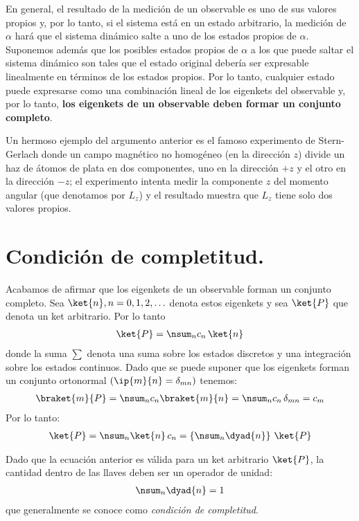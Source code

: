 En general, el resultado de la medición de un observable es uno de sus valores propios y, por lo tanto, si el sistema está en un estado arbitrario, la medición de $\alpha$ hará que el sistema dinámico salte a uno de los estados propios de $\alpha$. Suponemos además que los posibles estados propios de $\alpha$ a los que puede saltar el sistema dinámico son tales que el estado original debería ser expresable linealmente en términos de los estados propios. Por lo tanto, cualquier estado puede expresarse como una combinación lineal de los eigenkets del observable y, por lo tanto, \textbf{los eigenkets de un observable deben formar un conjunto completo}.
\par
Un hermoso ejemplo del argumento anterior es el famoso experimento de Stern-Gerlach donde un campo magnético no homogéneo (en la dirección $z$) divide un haz de átomos de plata en dos componentes, uno en la dirección $+z$ y el otro en la dirección $-z$; el experimento intenta medir la componente $z$ del momento angular (que denotamos por $L_{z}$) y el resultado muestra que $L_{z}$ tiene solo dos valores propios.

\section{Condición de completitud.}

Acabamos de afirmar que los eigenkets de un observable forman un conjunto completo. Sea $\ket{n}, n = 0, 1, 2, \ldots$ denota estos eigenkets y sea $\ket{P}$ que denota un ket arbitrario. Por lo tanto
\begin{align*}
\ket{P} = \nsum_{n} c_{n} \, \ket{n}
\end{align*}
donde la suma $\sum$ denota una suma sobre los estados discretos y una integración sobre los estados continuos. Dado que se puede suponer que los eigenkets forman un conjunto ortonormal $(\ip{m}{n} = \delta_{mn})$ tenemos:
\begin{align*}
\braket{m}{P} = \nsum_{n} c_{n} \braket{m}{n} = \nsum_{n} c_{n} \, \delta_{mn} = c_{m}
\end{align*}
Por lo tanto:
\begin{align}
\ket{P} = \nsum_{n} \ket{n} \, c_{n} = \left\{ \nsum_{n} \dyad{n} \right\} \, \ket{P}
\label{eq:ecuacion_39}
\end{align}

Dado que la ecuación anterior es válida para un ket arbitrario $\ket{P}$, la cantidad dentro de las llaves deben ser un operador de unidad:
\begin{align}
\nsum_{n} \dyad{n} = 1
\label{eq:ecuacion_40}
\end{align}
que generalmente se conoce como \emph{condición de completitud}.

